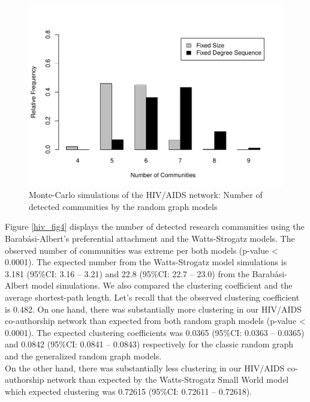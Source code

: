 \begin{figure}%
\includegraphics[scale=0.65]{Chapters/hiv/randomComm}
\centering
\caption{Monte-Carlo simulations of the HIV/AIDS network: Number of detected communities by the random graph models}
\label{hiv_fig3}
\end{figure}
Figure \ref{hiv_fig4} displays the number of detected research communities using the Barab\'asi-Albert's preferential attachment and the Watts-Strogatz models. The observed number of communities was extreme per both models (p-value < 0.0001). The expected number from the Watts-Strogatz model simulations is 3.181 (95\%CI: 3.16 -- 3.21) and 22.8 (95\%CI: 22.7 -- 23.0) from the Barab\'asi-Albert model simulations. 
We also compared the clustering coefficient and the average shortest-path length. Let's recall that the observed clustering coefficient is 0.482. On one hand, there was substantially more clustering in our HIV/AIDS co-authorship network than expected from both random graph models (p-value < 0.0001). The expected clustering coefficients was 0.0365 (95\%CI: 0.0363 -- 0.0365) and 0.0842 (95\%CI: 0.0841 -- 0.0843) respectively for the classic random graph and the generalized random graph models.\\
On the other hand, there was substantially less clustering in our HIV/AIDS co-authorship network than expected by the Watts-Strogatz Small World model which expected clustering was 0.72615 (95\%CI: 0.72611 -- 0.72618).


